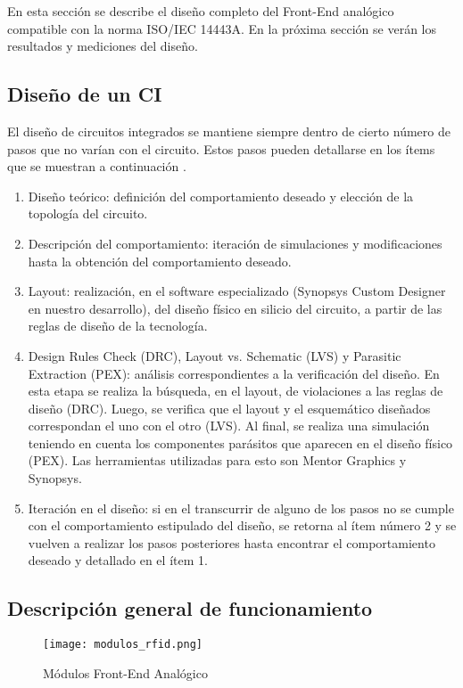 En esta sección se describe el diseño completo del Front-End analógico compatible con la norma ISO/IEC 14443A. En la próxima sección se verán los resultados y mediciones del diseño. 

\subsection{Diseño de un CI}
El diseño de circuitos integrados se mantiene
siempre dentro de cierto número de pasos que
no varían con el circuito. Estos pasos pueden
detallarse en los ítems que se muestran a continuación \cite{detect_fallas_500nm}.

\begin{enumerate}
\item Diseño teórico: definición del comportamiento
deseado y elección de la topología del circuito.
\item Descripción del comportamiento: iteración de
simulaciones y modificaciones hasta la obtención
del comportamiento deseado.
\item Layout: realización, en el software especializado
(Synopsys Custom Designer en nuestro
desarrollo), del diseño físico en silicio del
circuito, a partir de las reglas de diseño de la
tecnología.
\item Design Rules Check (DRC), Layout vs. Schematic
(LVS) y Parasitic Extraction (PEX): análisis
correspondientes a la verificación del diseño.
En esta etapa se realiza la búsqueda, en
el layout, de violaciones a las reglas de diseño
(DRC). Luego, se verifica que el layout y el esquemático
diseñados correspondan el uno con
el otro (LVS). Al final, se realiza una simulación
teniendo en cuenta los componentes parásitos
que aparecen en el diseño físico (PEX). Las herramientas
utilizadas para esto son Mentor Graphics y Synopsys.
\item Iteración en el diseño: si en el transcurrir de
alguno de los pasos no se cumple con el comportamiento
estipulado del diseño, se retorna al
ítem número 2 y se vuelven a realizar los pasos
posteriores hasta encontrar el comportamiento
deseado y detallado en el ítem 1.
\end{enumerate}

\subsection{Descripción general de funcionamiento}

\begin{figure}[H]
\centering
\texttt{[image: modulos\_rfid.png]}
\caption{Módulos Front-End Analógico}
\label{fig:modulos_rfid}
\end{figure}

